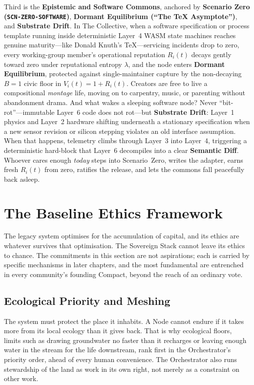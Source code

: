 Third is the \textbf{Epistemic and Software Commons}, anchored by \textbf{Scenario Zero (\texttt{SCN-ZERO-SOFTWARE})}, \textbf{Dormant Equilibrium (``The \TeX{} Asymptote'')}, and \textbf{Substrate Drift}. In The Collective, when a software specification or process template running inside deterministic Layer~4 WASM state machines reaches genuine maturity---like Donald Knuth's \TeX{}---servicing incidents drop to zero, every working-group member's operational reputation $R_i(t)$ decays gently toward zero under reputational entropy $\lambda$, and the node enters \textbf{Dormant Equilibrium}, protected against single-maintainer capture by the non-decaying $B = 1$ civic floor in $V_i(t) = 1 + R_i(t)$. Creators are free to live a compositional \textit{montage} life, moving on to carpentry, music, or parenting without abandonment drama. And what wakes a sleeping software node? Never ``bit-rot''---immutable Layer~6 code does not rot---but \textbf{Substrate Drift}: Layer~1 physics and Layer~2 hardware shifting underneath a stationary specification when a new sensor revision or silicon stepping violates an old interface assumption. When that happens, telemetry climbs through Layer~3 into Layer~4, triggering a deterministic hard-block that Layer~6 decompiles into a clear \textbf{Semantic Diff}. Whoever cares enough \textit{today} steps into Scenario~Zero, writes the adapter, earns fresh $R_i(t)$ from zero, ratifies the release, and lets the commons fall peacefully back asleep.

\section{The Baseline Ethics Framework}

The legacy system optimises for the accumulation of capital, and its ethics are whatever survives that optimisation. The Sovereign Stack cannot leave its ethics to chance. The commitments in this section are not aspirations; each is carried by specific mechanisms in later chapters, and the most fundamental are entrenched in every community's founding Compact, beyond the reach of an ordinary vote.

\subsection{Ecological Priority and Meshing}

The system must protect the place it inhabits. A Node cannot endure if it takes more from its local ecology than it gives back. That is why ecological floors, limits such as drawing groundwater no faster than it recharges or leaving enough water in the stream for the life downstream, rank first in the Orchestrator's priority order, ahead of every human convenience. The Orchestrator also runs stewardship of the land as work in its own right, not merely as a constraint on other work.


